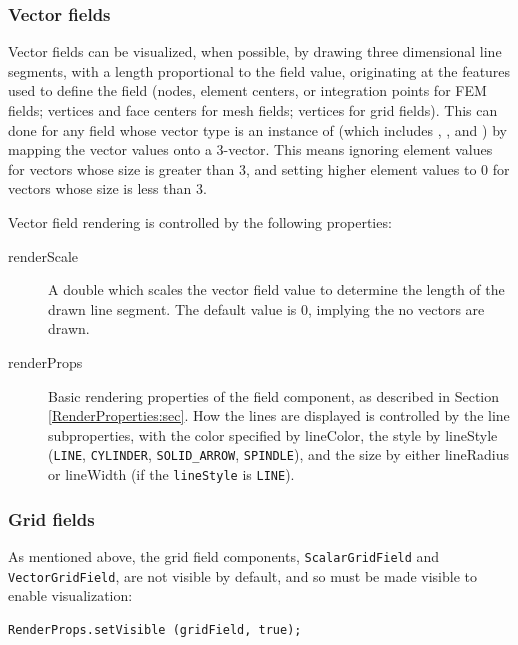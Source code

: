 \subsubsection{Vector fields}

Vector fields can be visualized, when possible, by drawing three
dimensional line segments, with a length proportional to the field
value, originating at the features used to define the field (nodes,
element centers, or integration points for FEM fields; vertices and
face centers for mesh fields; vertices for grid fields).  This can
done for any field whose vector type is an instance of
 (which includes
,
, and
) by mapping the vector values
onto a 3-vector. This means ignoring element values for vectors whose
size is greater than 3, and setting higher element values to 0 for
vectors whose size is less than 3.

Vector field rendering is controlled by the following properties:

\begin{description}

\item[renderScale]\mbox{}

A double which scales the vector field value to determine the length
of the drawn line segment. The default value is 0, implying the no
vectors are drawn.

\item[renderProps]\mbox{}

Basic rendering properties of the field component, as described in
Section \ref{RenderProperties:sec}. How the lines are displayed is
controlled by the line subproperties, with the color specified by {\sf
lineColor}, the style by {\sf lineStyle} ({\tt LINE}, {\tt CYLINDER},
{\tt SOLID\_ARROW}, {\tt SPINDLE}), and the size by either {\sf
lineRadius} or {\sf lineWidth} (if the {\tt lineStyle} is {\tt LINE}).

\end{description}

\subsubsection{Grid fields}
\label{gridFields:sec}

As mentioned above, the grid field components, {\tt ScalarGridField}
and {\tt VectorGridField}, are not visible by default, and so must be
made visible to enable visualization:
%
\begin{lstlisting}[]
  RenderProps.setVisible (gridField, true);
\end{lstlisting}
%

